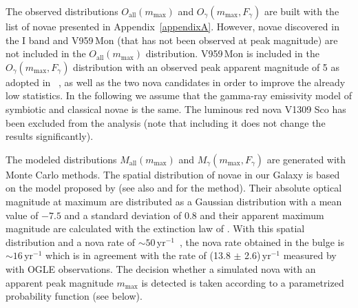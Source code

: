 \documentclass{aa} %
\begin{document}
The observed distributions $O_{\textrm{all}}(m_{\textrm{max}})$ and $O_{\gamma}(m_{\textrm{max}}, F_{\gamma})$ are built with the list of novae presented in Appendix~\ref{appendixA}. However, novae discovered in the I band and V959\,Mon (that has not been observed at peak magnitude) are not included in the $O_{\textrm{all}}(m_{\textrm{max}})$ distribution. V959\,Mon is included in the $O_{\gamma}(m_{\textrm{max}}, F_{\gamma})$ distribution with an observed peak apparent magnitude of 5 as adopted in ~\citet[][see references herein]{2014Sci...345..554A}, as well as the two nova candidates in order to improve the already low statistics. In the following we assume that the gamma-ray emissivity model of symbiotic and classical novae is the same. The luminous red nova V1309 Sco has been excluded from the analysis (note that including it does not change the results significantly).

The modeled distributions $M_{\textrm{all}}(m_{\textrm{max}})$ and $M_{\gamma}(m_{\textrm{max}}, F_{\gamma})$ are generated with Monte Carlo methods. The spatial distribution of novae in our Galaxy is based on the model proposed by \citet{1991ApJ...378..131K} (see also \citet{2008A&A...485..223S} and \citet{2000MNRAS.319..350J} for the method). Their absolute optical magnitude at maximum are distributed as a Gaussian distribution with a mean value of $-7.5$ and a standard deviation of $0.8$ \citep[as in][]{2017ApJ...834..196S} and their apparent maximum magnitude are calculated with the extinction law of \citet{2017ApJ...834..196S}. 
With this spatial distribution and a nova rate of $\sim 50$\,yr$^{-1}$~\citep{2017ApJ...834..196S}, the nova rate obtained in the bulge is $\sim 16$\,yr$^{-1}$ which is in agreement with the rate of (13.8 $\pm$ 2.6)\,yr$^{-1}$ measured by \citet{OGLEREF2} with OGLE observations. 
The decision whether a simulated nova with an apparent peak magnitude $m_{\textrm{max}}$ is detected is taken according to a parametrized probability function (see below). 
\end{document}
